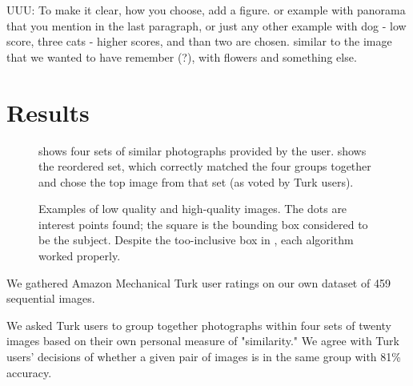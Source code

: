 \documentclass{article}
\begin{document}
UUU: To make it clear, how you choose, add a figure. 
or example with panorama that you mention in the last paragraph, or just any
other example with dog - low score, three cats - higher scores, and than two are 
chosen. similar to the image that we wanted to have remember (?), with flowers and 
something else.


\section{Results}

\begin{figure*}[t!]
\centering
{}
\caption{ shows four sets of similar photographs provided by the user.  shows the reordered set, which correctly matched the four groups together and chose the top image from that set (as voted by Turk users).}
\label{fig:ResultSorting}
\end{figure*}

\begin{figure*}[t!]
\centering
{}
\caption{Examples of  low quality and  high-quality images. The dots are interest points found; the square is the bounding box considered to be the subject. Despite the too-inclusive box in , each algorithm worked properly.}
\label{fig:Examples}
\end{figure*}

We gathered Amazon Mechanical Turk user ratings on our own dataset of 459 sequential images.


We asked Turk users to group together photographs within four sets of twenty images based on their own personal measure of "similarity." We agree with Turk users' decisions of whether a given pair of images is in the same group with 81\% accuracy.
\end{document}

